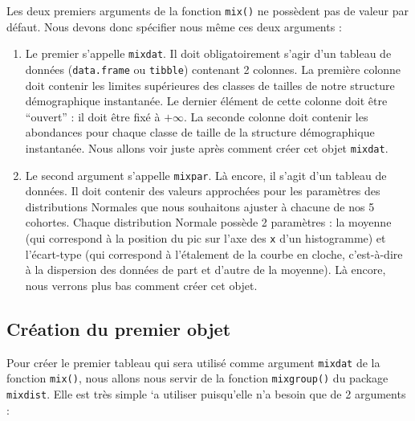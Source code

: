 \documentclass[
  a4paper,
  DIV=11,
  numbers=noendperiod,
  oneside]{scrreprt}
\providecommand{\tightlist}{%
  \setlength{\itemsep}{0pt}\setlength{\parskip}{0pt}}\usepackage{longtable,booktabs,array}
\begin{document}

Les deux premiers arguments de la fonction \texttt{mix()} ne possèdent
pas de valeur par défaut. Nous devons donc spécifier nous même ces deux
arguments :

\begin{enumerate}
\def\labelenumi{\arabic{enumi}.}
\tightlist
\item
  Le premier s'appelle \texttt{mixdat}. Il doit obligatoirement s'agir
  d'un tableau de données (\texttt{data.frame} ou \texttt{tibble})
  contenant 2 colonnes. La première colonne doit contenir les limites
  supérieures des classes de tailles de notre structure démographique
  instantanée. Le dernier élément de cette colonne doit être ``ouvert''
  : il doit être fixé à \(+\infty\). La seconde colonne doit contenir
  les abondances pour chaque classe de taille de la structure
  démographique instantanée. Nous allons voir juste après comment créer
  cet objet \texttt{mixdat}.
\item
  Le second argument s'appelle \texttt{mixpar}. Là encore, il s'agit
  d'un tableau de données. Il doit contenir des valeurs approchées pour
  les paramètres des distributions Normales que nous souhaitons ajuster
  à chacune de nos 5 cohortes. Chaque distribution Normale possède 2
  paramètres : la moyenne (qui correspond à la position du pic sur l'axe
  des \texttt{x} d'un histogramme) et l'écart-type (qui correspond à
  l'étalement de la courbe en cloche, c'est-à-dire à la dispersion des
  données de part et d'autre de la moyenne). Là encore, nous verrons
  plus bas comment créer cet objet.
\end{enumerate}

\hypertarget{cruxe9ation-du-premier-objet}{%
\subsection{Création du premier
objet}\label{cruxe9ation-du-premier-objet}}

Pour créer le premier tableau qui sera utilisé comme argument
\texttt{mixdat} de la fonction \texttt{mix()}, nous allons nous servir
de la fonction \texttt{mixgroup()} du package \texttt{mixdist}. Elle est
très simple `a utiliser puisqu'elle n'a besoin que de 2 arguments :
\end{document}
